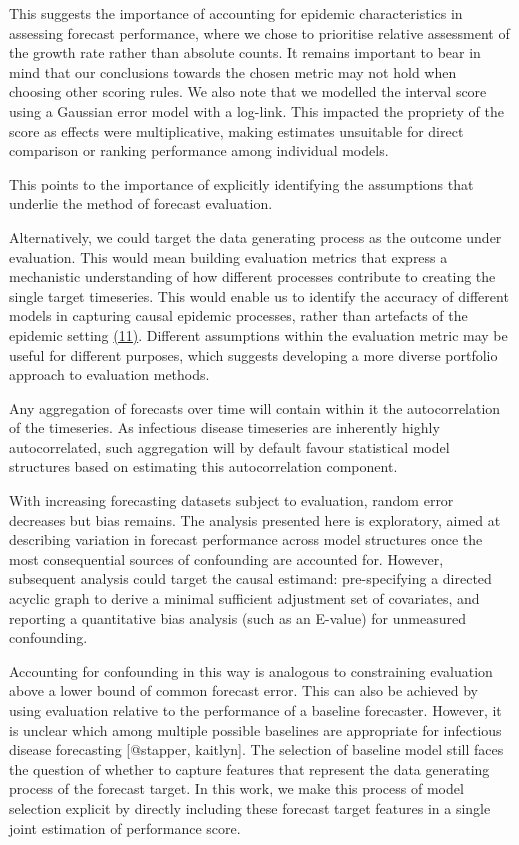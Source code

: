 \documentclass[
  letterpaper,
  DIV=11,
  numbers=noendperiod]{scrartcl}
\begin{document}
This suggests the importance of accounting for epidemic characteristics
in assessing forecast performance, where we chose to prioritise relative
assessment of the growth rate rather than absolute counts. It remains
important to bear in mind that our conclusions towards the chosen metric
may not hold when choosing other scoring rules. We also note that we
modelled the interval score using a Gaussian error model with a
log-link. This impacted the propriety of the score as effects were
multiplicative, making estimates unsuitable for direct comparison or
ranking performance among individual models.

This points to the importance of explicitly identifying the assumptions
that underlie the method of forecast evaluation.

Alternatively, we could target the data generating process as the
outcome under evaluation. This would mean building evaluation metrics
that express a mechanistic understanding of how different processes
contribute to creating the single target timeseries. This would enable
us to identify the accuracy of different models in capturing causal
epidemic processes, rather than artefacts of the epidemic setting
\href{https://www.zotero.org/google-docs/?c33gx9}{(11)}. Different
assumptions within the evaluation metric may be useful for different
purposes, which suggests developing a more diverse portfolio approach to
evaluation methods.

Any aggregation of forecasts over time will contain within it the
autocorrelation of the timeseries. As infectious disease timeseries are
inherently highly autocorrelated, such aggregation will by default
favour statistical model structures based on estimating this
autocorrelation component.

With increasing forecasting datasets subject to evaluation, random error
decreases but bias remains. The analysis presented here is exploratory,
aimed at describing variation in forecast performance across model
structures once the most consequential sources of confounding are
accounted for. However, subsequent analysis could target the causal
estimand: pre-specifying a directed acyclic graph to derive a minimal
sufficient adjustment set of covariates, and reporting a quantitative
bias analysis (such as an E-value) for unmeasured confounding.

Accounting for confounding in this way is analogous to constraining
evaluation above a lower bound of common forecast error. This can also
be achieved by using evaluation relative to the performance of a
baseline forecaster. However, it is unclear which among multiple
possible baselines are appropriate for infectious disease forecasting
{[}@stapper, kaitlyn{]}. The selection of baseline model still faces the
question of whether to capture features that represent the data
generating process of the forecast target. In this work, we make this
process of model selection explicit by directly including these forecast
target features in a single joint estimation of performance score.
\end{document}
